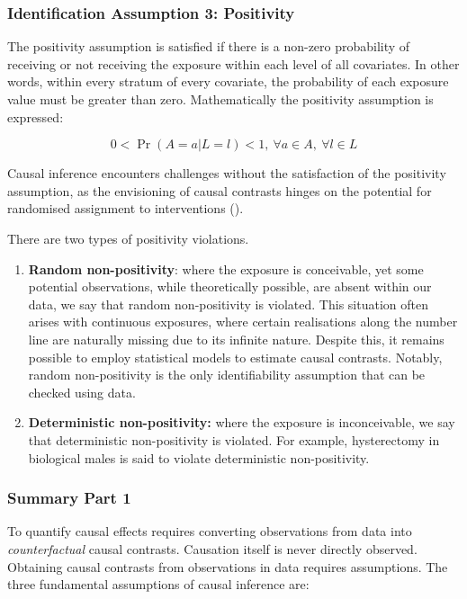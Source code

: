 \documentclass[
  singlecolumn,
  9pt]{article}
\begin{document}
\subsubsection{Identification Assumption 3:
Positivity}\label{identification-assumption-3-positivity}

The positivity assumption is satisfied if there is a non-zero
probability of receiving or not receiving the exposure within each level
of all covariates. In other words, within every stratum of every
covariate, the probability of each exposure value must be greater than
zero. Mathematically the positivity assumption is expressed:

\[
0 < \Pr(A=a|L=l)<1, ~ \forall a \in A, ~ \forall l \in L
\]

Causal inference encounters challenges without the satisfaction of the
positivity assumption, as the envisioning of causal contrasts hinges on
the potential for randomised assignment to interventions
().

There are two types of positivity violations.

\begin{enumerate}
\def\labelenumi{\arabic{enumi}.}
\item
  \textbf{Random non-positivity}: where the exposure is conceivable, yet
  some potential observations, while theoretically possible, are absent
  within our data, we say that random non-positivity is violated. This
  situation often arises with continuous exposures, where certain
  realisations along the number line are naturally missing due to its
  infinite nature. Despite this, it remains possible to employ
  statistical models to estimate causal contrasts. Notably, random
  non-positivity is the only identifiability assumption that can be
  checked using data.
\item
  \textbf{Deterministic non-positivity:} where the exposure is
  inconceivable, we say that deterministic non-positivity is violated.
  For example, hysterectomy in biological males is said to violate
  deterministic non-positivity.
\end{enumerate}

\subsubsection{Summary Part 1}\label{summary-part-1}

To quantify causal effects requires converting observations from data
into \emph{counterfactual} causal contrasts. Causation itself is never
directly observed. Obtaining causal contrasts from observations in data
requires assumptions. The three fundamental assumptions of causal
inference are:
\end{document}
